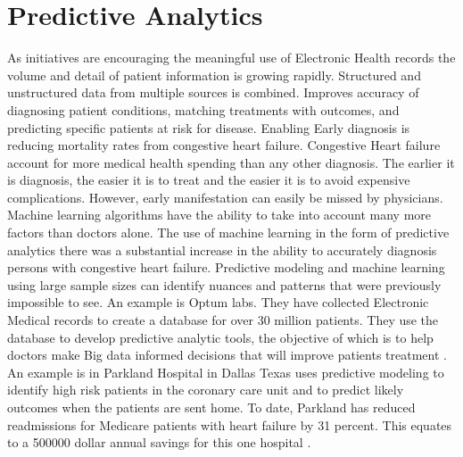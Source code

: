 \documentclass[sigconf]{acmart}
\begin{document}
\section{Predictive Analytics}
As initiatives are encouraging the meaningful use of Electronic Health records the volume and detail of patient information is growing rapidly.  Structured and unstructured data from multiple sources is combined. Improves accuracy of diagnosing patient conditions, matching treatments with outcomes, and predicting specific patients at risk for disease. Enabling Early diagnosis is reducing mortality rates from congestive heart failure. Congestive Heart failure account for more medical health spending than any other diagnosis. The earlier it is diagnosis, the easier it is to treat and the easier it is to avoid expensive complications. However, early manifestation can easily be missed by physicians. Machine learning algorithms have the ability to take into account many more factors than doctors alone. The use of machine learning in the form of predictive analytics there was a substantial increase in the ability to accurately diagnosis persons with congestive heart failure. Predictive modeling and machine learning using large sample sizes can identify nuances and patterns that were previously impossible to see.  An example is Optum labs. They have collected Electronic Medical records to create a database for over 30 million patients. They use the database to develop predictive analytic tools, the objective of which is to help doctors make Big data informed decisions that will improve patients treatment \cite{www-google-McDonald}.  
An example is in Parkland Hospital in Dallas Texas uses predictive modeling to identify high risk patients in the coronary care unit and to predict likely outcomes when the patients are sent home. To date, Parkland has reduced readmissions for Medicare patients with heart failure by 31 percent. This equates to a 500000 dollar annual savings for this one hospital \cite{www-google-datafloq}. 
\end{document}
